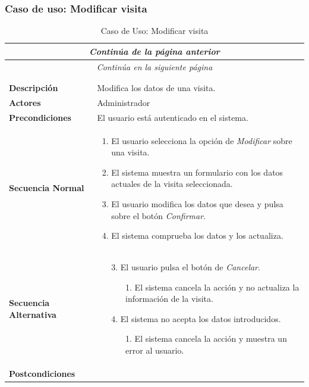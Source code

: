 \newpage
\subsubsection*{Caso de uso: Modificar visita }
\begin{longtable}{| p{4cm} | p{10cm} |}
\endfirsthead
\multicolumn{2}{c}{\textit{Continúa de la página anterior}}\\[12pt]
\hline
\endhead
\hline
\multicolumn{2}{c}{\textit{Continúa en la siguiente página}} \\
\endfoot
\hline
\caption{Caso de Uso: Modificar visita}\label{fig:1}\\
\endlastfoot


\hline
\multicolumn{2}{|c|}{\textbf{CU$<$32$>$ - Modificar Visita}} \\

\hline
\textbf{Descripción} &
Modifica los datos de una visita.\\

\hline
\textbf{Actores} &
Administrador\\

\hline
\textbf{Precondiciones} &
El usuario está autenticado en el sistema.\\

\hline
\textbf{Secuencia Normal} &\mbox{}\par\vspace{-\baselineskip}
\begin{enumerate}[leftmargin=0.7cm, topsep=0.1cm]
\item El usuario selecciona la opción de \textit{Modificar} sobre una visita.
\item El sistema muestra un formulario con los datos actuales de la visita seleccionada.
\item El usuario modifica los datos que desea y pulsa sobre el botón \textit{Confirmar}.
\item El sistema comprueba los datos y los actualiza.
\end{enumerate}


\\
\hline
\textbf{Secuencia Alternativa} &\mbox{}\par\vspace{-\baselineskip}
\begin{enumerate}[leftmargin=0.9cm, topsep=0.1cm]
\item[3.] El usuario pulsa el botón de \textit{Cancelar}.
	\begin{itemize}
	\item[1.] El sistema cancela la acción y no actualiza la información de la visita.
	\end{itemize}
\item[4.] El sistema no acepta los datos introducidos.
	\begin{itemize}
	\item[1.] El sistema cancela la acción y muestra un error al usuario.
	\end{itemize}
\end{enumerate}
\\

\hline
\textbf{Postcondiciones} & \\
\hline
\end{longtable}
